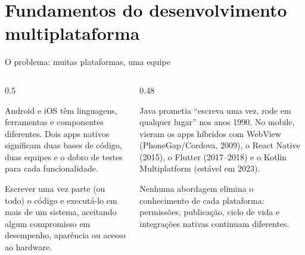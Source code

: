 \section{Fundamentos do desenvolvimento multiplataforma}

\begin{frame}{O problema: muitas plataformas, uma equipe}
  \begin{columns}[c]
    \begin{column}{0.5\textwidth}
      \begin{conceito}
        Android e iOS têm linguagens, ferramentas e componentes diferentes. Dois apps nativos significam duas bases de código, duas equipes e o dobro de testes para cada funcionalidade.
      \end{conceito}
      \begin{definicao}
        Escrever uma vez parte (ou todo) o código e executá-lo em mais de um sistema, aceitando algum compromisso em desempenho, aparência ou acesso ao hardware.
      \end{definicao}
    \end{column}
    \begin{column}{0.48\textwidth}
      \begin{historia}
        Java prometia ``escreva uma vez, rode em qualquer lugar'' nos anos 1990. No mobile, vieram os apps híbridos com WebView (PhoneGap/Cordova, 2009), o React Native (2015), o Flutter (2017--2018) e o Kotlin Multiplatform (estável em 2023).
      \end{historia}
      \begin{atencao}
        Nenhuma abordagem elimina o conhecimento de cada plataforma: permissões, publicação, ciclo de vida e integrações nativas continuam diferentes.
      \end{atencao}
    \end{column}
  \end{columns}
\end{frame}

